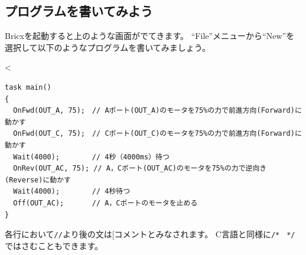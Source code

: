 \documentclass[11pt]{jarticle}
\makeatletter
\def\nmindex{\@ifnextchar[{\@nmindex}{\@@nmindex}}
\def\@nmindex[#1]#2{#2\index{#1@#2}}
\def\@@nmindex#1{#1\index{#1}}
\makeatother
\begin{document}
\subsection{プログラムを書いてみよう}

\begin{center}
  \begin{minipage}[t]{10cm}\centering
  \end{minipage}
\end{center}


Bricxを起動すると上のような画面がでてきます。
``File''メニューから``New''を選択して以下のようなプログラムを書いてみましょう。

<
\begin{screen}{\small
\begin{verbatim}
task main()
{
  OnFwd(OUT_A, 75);　// Aポート(OUT_A)のモータを75%の力で前進方向(Forward)に動かす
  OnFwd(OUT_C, 75);　// Cポート(OUT_C)のモータを75%の力で前進方向(Forward)に動かす
  Wait(4000);　　　　 // 4秒（4000ms）待つ
  OnRev(OUT_AC, 75); // A，Cポート(OUT_AC)のモータを75%の力で逆向き(Reverse)に動かす
  Wait(4000);　　　　 // 4秒待つ
  Off(OUT_AC);　　　　// A，Cポートのモータを止める
}
\end{verbatim}}
\end{screen}
各行において\verb|//|より後の文は\nmindex{コメント}とみなされます。
C言語と同様に\verb|/*　*/|ではさむこともできます。
\end{document}
